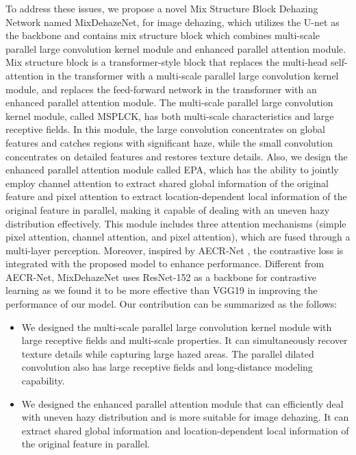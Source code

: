 \documentclass[10pt,twocolumn,letterpaper]{article}
\begin{document}
To address these issues, we propose a novel Mix Structure Block Dehazing Network named MixDehazeNet, for image dehazing, which utilizes the U-net \cite{u-net} as the backbone and contains mix structure block which combines multi-scale parallel large convolution kernel module and enhanced parallel attention module. Mix structure block is a transformer-style block that replaces the multi-head self-attention in the transformer with a multi-scale parallel large convolution kernel module, and replaces the feed-forward network in the transformer with an enhanced parallel attention module.
The multi-scale parallel large convolution kernel module, called MSPLCK, has both multi-scale characteristics and large receptive fields. In this module, the large convolution concentrates on global features and catches regions with significant haze, while the small convolution concentrates on detailed features and restores texture details.  Also, we design the enhanced parallel attention module called EPA, which has the ability to jointly employ channel attention to extract shared global information of the original feature and pixel attention to extract location-dependent local information of the original feature in parallel, making it capable of dealing with an uneven hazy distribution effectively. This module includes three attention mechanisms (simple pixel attention, channel attention, and pixel attention), which are fused through a multi-layer perception. Moreover, inspired by AECR-Net \cite{AECR-net}, the contrastive loss is integrated with the proposed model to enhance performance. Different from AECR-Net, MixDehazeNet uses ResNet-152 \cite{ResNet} as a backbone for contrastive learning as we found it to be more effective than VGG19 \cite{Vgg} in improving the performance of our model. Our contribution can be summarized as the follows:

\begin{itemize}
    \item We designed the multi-scale parallel large convolution kernel module with large receptive fields and multi-scale properties. It can simultaneously recover texture details while capturing large hazed areas. The parallel dilated convolution also has large receptive fields and long-distance modeling capability.
\end{itemize}

 \begin{itemize}
    \item  We designed the enhanced parallel attention module that can efficiently deal with uneven hazy distribution and is more suitable for image dehazing. It can extract shared global information and location-dependent local information of the original feature in parallel.
\end{itemize}
\end{document}
